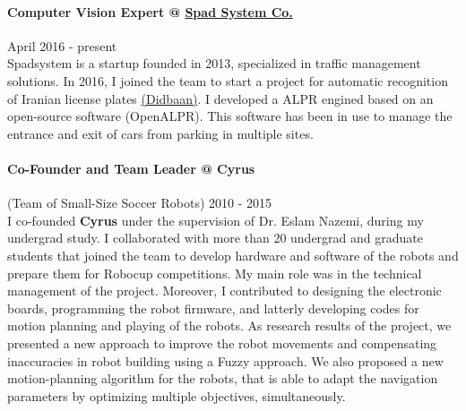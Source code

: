 \documentclass[10pt]{res}
\begin{document}
\begin{resume}
\paragraph{Computer Vision Expert @ \href{http://www.spadsystem.com/}{Spad System Co.} } \hfill April 2016 - present\\
Spadsystem is a startup founded in 2013, specialized in traffic management solutions. In 2016, I joined the team to start a project for automatic recognition of Iranian license plates \href{http://didbaan.com}{(Didbaan)}. I developed a ALPR engined based on an open-source software (OpenALPR). This software has been in use to manage the entrance and exit of cars from parking in multiple sites.

\paragraph{Co-Founder and Team Leader @ {Cyrus}}(Team of Small-Size Soccer Robots) \hfill 2010 - 2015\\
I co-founded \textbf{Cyrus} under the supervision of Dr. Eslam Nazemi, during my undergrad study. I collaborated with more than 20 undergrad and graduate students that joined the team to develop hardware and software of the robots and prepare them for Robocup competitions. My main role was in the technical management of the project. Moreover,  I contributed to designing the electronic boards, programming the robot firmware, and latterly developing codes for motion planning and playing of the robots. As research results of the project, we presented a new approach to improve the robot movements and compensating inaccuracies in robot building using a Fuzzy approach. We also proposed a new motion-planning algorithm for the robots, that is able to adapt the navigation parameters by optimizing multiple objectives, simultaneously.





\end{resume}
\end{document}

